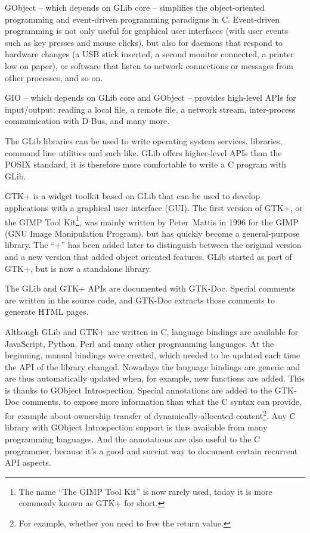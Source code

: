 GObject -- which depends on GLib core -- simplifies the object-oriented programming and event-driven programming paradigms in C. Event-driven programming is not only useful for graphical user interfaces (with user events such as key presses and mouse clicks), but also for daemons that respond to hardware changes (a USB stick inserted, a second monitor connected, a printer low on paper), or software that listen to network connections or messages from other processes, and so on.

GIO -- which depends on GLib core and GObject -- provides high-level APIs for input/output: reading a local file, a remote file, a network stream, inter-process communication with D-Bus, and many more.

The GLib libraries can be used to write operating system services, libraries, command line utilities and such like. GLib offers higher-level APIs than the POSIX standard, it is therefore more comfortable to write a C program with GLib.

GTK+ is a widget toolkit based on GLib that can be used to develop applications with a graphical user interface (GUI). The first version of GTK+, or the GIMP Tool Kit\footnote{The name ``The GIMP Tool Kit'' is now rarely used, today it is more commonly known as GTK+ for short.}, was mainly written by Peter~Mattis in 1996 for the GIMP (GNU Image Manipulation Program), but has quickly become a general-purpose library. The ``+'' has been added later to distinguish between the original version and a new version that added object oriented features. GLib started as part of GTK+, but is now a standalone library.

The GLib and GTK+ APIs are documented with GTK-Doc. Special comments are written in the source code, and GTK-Doc extracts those comments to generate HTML pages.

Although GLib and GTK+ are written in C, language bindings are available for JavaScript, Python, Perl and many other programming languages. At the beginning, manual bindings were created, which needed to be updated each time the API of the library changed. Nowadays the language bindings are generic and are thus automatically updated when, for example, new functions are added. This is thanks to GObject Introspection. Special annotations are added to the GTK-Doc comments, to expose more information than what the C syntax can provide, for example about ownership transfer of dynamically-allocated content\footnote{For example, whether you need to free the return value.}. Any C library with GObject Introspection support is thus available from many programming languages. And the annotations are also useful to the C programmer, because it's a good and succint way to document certain recurrent API aspects.

